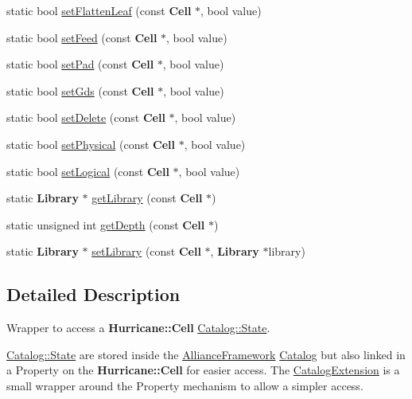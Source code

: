 \begin{DoxyCompactItemize}
static bool \mbox{\hyperlink{classCRL_1_1CatalogExtension_a00772e9c455d0e44caf132ee724b958d}{set\+Flatten\+Leaf}} (const \textbf{ Cell} $\ast$, bool value)
\item 
static bool \mbox{\hyperlink{classCRL_1_1CatalogExtension_ab82e4b139ca636feaca5d97836891b68}{set\+Feed}} (const \textbf{ Cell} $\ast$, bool value)
\item 
static bool \mbox{\hyperlink{classCRL_1_1CatalogExtension_afceda0d184ed2964e160b563a216bc35}{set\+Pad}} (const \textbf{ Cell} $\ast$, bool value)
\item 
static bool \mbox{\hyperlink{classCRL_1_1CatalogExtension_a6c440bfd5ac56c9e07213c1347f0610a}{set\+Gds}} (const \textbf{ Cell} $\ast$, bool value)
\item 
static bool \mbox{\hyperlink{classCRL_1_1CatalogExtension_a8a5bdbfb8c898f8ea00c8718c6714983}{set\+Delete}} (const \textbf{ Cell} $\ast$, bool value)
\item 
static bool \mbox{\hyperlink{classCRL_1_1CatalogExtension_ae3de9795e0ddce5a767cf53d79fec077}{set\+Physical}} (const \textbf{ Cell} $\ast$, bool value)
\item 
static bool \mbox{\hyperlink{classCRL_1_1CatalogExtension_a9609c756887f433fe9b250e32ff1ae0a}{set\+Logical}} (const \textbf{ Cell} $\ast$, bool value)
\item 
static \textbf{ Library} $\ast$ \mbox{\hyperlink{classCRL_1_1CatalogExtension_a6681f9fbe64998a27fe532fd3591afc7}{get\+Library}} (const \textbf{ Cell} $\ast$)
\item 
static unsigned int \mbox{\hyperlink{classCRL_1_1CatalogExtension_ae4f8d30cf08796b62422546c05526d86}{get\+Depth}} (const \textbf{ Cell} $\ast$)
\item 
static \textbf{ Library} $\ast$ \mbox{\hyperlink{classCRL_1_1CatalogExtension_a6ef1b96f9bbbe39e13a5aba073f2394c}{set\+Library}} (const \textbf{ Cell} $\ast$, \textbf{ Library} $\ast$library)
\end{DoxyCompactItemize}


\subsection{Detailed Description}
Wrapper to access a \textbf{ Hurricane\+::\+Cell} \mbox{\hyperlink{classCRL_1_1Catalog_1_1State}{Catalog\+::\+State}}. 

\mbox{\hyperlink{classCRL_1_1Catalog_1_1State}{Catalog\+::\+State}} are stored inside the \mbox{\hyperlink{classCRL_1_1AllianceFramework}{Alliance\+Framework}} \mbox{\hyperlink{classCRL_1_1Catalog}{Catalog}} but also linked in a Property on the \textbf{ Hurricane\+::\+Cell} for easier access. The \mbox{\hyperlink{classCRL_1_1CatalogExtension}{Catalog\+Extension}} is a small wrapper around the Property mechanism to allow a simpler access. 

